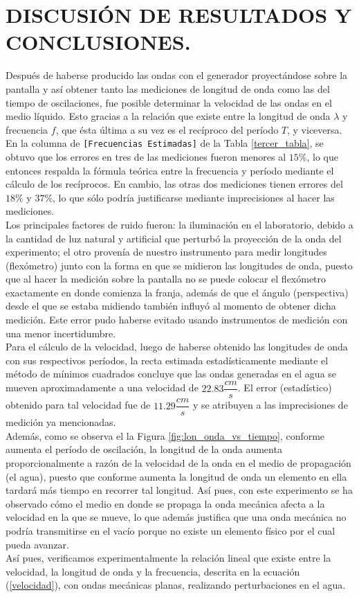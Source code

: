 \documentclass[12pt,a4paper]{article}
\begin{document}
\section{DISCUSIÓN DE RESULTADOS Y CONCLUSIONES.} %
Después de haberse producido las ondas con el generador proyectándose sobre la pantalla y así obtener tanto las mediciones de longitud de onda como las del tiempo de oscilaciones, fue posible determinar la velocidad de las ondas en el medio líquido. Esto gracias a la relación que existe entre la longitud de onda $\lambda$ y frecuencia $f$, que ésta última a su vez es el recíproco del período $T$, y viceversa. \\[2mm]
En la columna de \texttt{[Frecuencias Estimadas]} de la Tabla \ref{tercer_tabla}, se obtuvo que los errores en tres de las mediciones fueron menores al $15$\textsc{\%}, lo que entonces respalda la fórmula teórica entre la frecuencia y período mediante el cálculo de los recíprocos. En cambio, las otras dos mediciones tienen errores del $18$\textsc{\%} y $37$\textsc{\%}, lo que sólo podría justificarse mediante imprecisiones al hacer las mediciones. \\[2mm]
Los principales factores de ruido fueron: la iluminación en el laboratorio, debido a la cantidad de luz natural y artificial que perturbó la proyección de la onda del experimento; el otro provenía de nuestro instrumento para medir longitudes (flexómetro) junto con la forma en que se midieron las longitudes de onda, puesto que al hacer la medición sobre la pantalla no se puede colocar el flexómetro exactamente en donde comienza la franja, además de que el ángulo (perspectiva) desde el que se estaba midiendo también influyó al momento de obtener dicha medición. Este error pudo haberse evitado usando instrumentos de medición con una menor incertidumbre. \\[2mm]
Para el cálculo de la velocidad, luego de haberse obtenido las longitudes de onda con sus respectivos períodos, la recta estimada estadísticamente mediante el método de mínimos cuadrados concluye que las ondas generadas en el agua se mueven aproximadamente a una velocidad de $22.83\dfrac{cm}{s}$. El error (estadístico) obtenido para tal velocidad fue de $11.29\dfrac{cm}{s}$ y se atribuyen a las imprecisiones de medición ya mencionadas. \\[2mm]
Además, como se observa el la Figura \ref{fig:lon_onda_vs_tiempo}, conforme aumenta el período de oscilación, la longitud de la onda aumenta proporcionalmente a razón de la velocidad de la onda en el medio de propagación (el agua), puesto que conforme aumenta la longitud de onda un elemento en ella tardará más tiempo en recorrer tal longitud. Así pues, con este experimento se ha observado cómo el medio en donde se propaga la onda mecánica afecta a la velocidad en la que se mueve, lo que además justifica que una onda mecánica no podría transmitirse en el vacío porque no existe un elemento físico por el cual pueda avanzar. \\[2mm]
Así pues, verificamos experimentalmente la relación lineal que existe entre la velocidad, la longitud de onda y la frecuencia, descrita en la ecuación (\ref{velocidad}), con ondas mecánicas planas, realizando perturbaciones en el agua.
\end{document}
